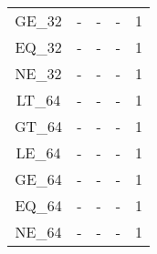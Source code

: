 \begin{longtable}{|c|c|c|c|c|}
GE\_32                  & -       & -       & -       & 1        \\
EQ\_32                  & -       & -       & -       & 1        \\
NE\_32                  & -       & -       & -       & 1        \\
LT\_64                  & -       & -       & -       & 1        \\
GT\_64                  & -       & -       & -       & 1        \\
LE\_64                  & -       & -       & -       & 1        \\
GE\_64                  & -       & -       & -       & 1        \\
EQ\_64                  & -       & -       & -       & 1        \\
NE\_64                  & -       & -       & -       & 1        \\
\end{longtable}


